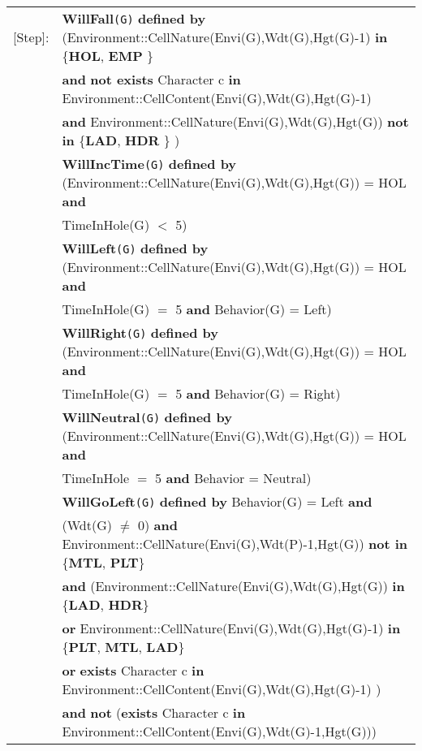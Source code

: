 \documentclass{article}
\begin{document}
\begin{tabular}{rl}
\textrm{[Step]}:
& \textbf{WillFall}\texttt{(G)} \textbf{defined by} (\textrm{Environment::CellNature(Envi(G),Wdt(G),Hgt(G)-1)} \textbf{in} \{\textbf{HOL}, \textbf{EMP} \}  \\
& \quad\quad \textbf{and} \textbf{not exists} \textrm{Character} c \textbf{in} \textrm{Environment::CellContent(Envi(G),Wdt(G),Hgt(G)-1)} \\
& \quad\quad \textbf{and} \textrm{Environment::CellNature(Envi(G),Wdt(G),Hgt(G))} \textbf{not in} \{\textbf{LAD}, \textbf{HDR} \} ) \\

& \textbf{WillIncTime}\texttt{(G)} \textbf{defined by} 
(\textrm{Environment::CellNature(Envi(G),Wdt(G),Hgt(G))} = \textrm{HOL} \textbf{and} \\
& \quad\quad \textrm{TimeInHole(G) $<$ 5)}
\\

& \textbf{WillLeft}\texttt{(G)} \textbf{defined by} 
(\textrm{Environment::CellNature(Envi(G),Wdt(G),Hgt(G))} = \textrm{HOL} \textbf{and} \\
& \quad\quad \textrm{TimeInHole(G)  $=$ 5} \textbf{and} \textrm{Behavior(G) = Left}) \\

& \textbf{WillRight}\texttt{(G)} \textbf{defined by} 
(\textrm{Environment::CellNature(Envi(G),Wdt(G),Hgt(G))} = \textrm{HOL} \textbf{and} \\
& \quad\quad \textrm{TimeInHole(G)  $=$ 5} \textbf{and} \textrm{Behavior(G)  = Right}) \\

& \textbf{WillNeutral}\texttt{(G)} \textbf{defined by} 
(\textrm{Environment::CellNature(Envi(G),Wdt(G),Hgt(G))} = \textrm{HOL} \textbf{and} \\
& \quad\quad \textrm{TimeInHole $=$ 5} \textbf{and} \textrm{Behavior = Neutral}) \\

& \textbf{WillGoLeft}\texttt{(G)} \textbf{defined by}  \textrm{Behavior(G)  = Left} \textbf{and}\\

& \quad (\textrm{Wdt(G)} $\neq$ 0) \textbf{and} \textrm{Environment::CellNature(Envi(G),Wdt(P)-1,Hgt(G))} \textbf{not in} \{\textbf{MTL}, \textbf{PLT}\} \\
& \quad\quad \textbf{and} (\textrm{Environment::CellNature(Envi(G),Wdt(G),Hgt(G))} \textbf{in} \{\textbf{LAD}, \textbf{HDR}\} \\
& \quad\quad\quad\quad \textbf{or} \textrm{Environment::CellNature(Envi(G),Wdt(G),Hgt(G)-1)} \textbf{in} \{\textbf{PLT}, \textbf{MTL}, \textbf{LAD}\} \\
& \quad\quad\quad\quad \textbf{or} \textbf{exists} \textrm{Character} c \textbf{in} \textrm{Environment::CellContent(Envi(G),Wdt(G),Hgt(G)-1)} ) \\
& \quad\quad \textbf{and} \textbf{not} (\textbf{exists} \textrm{Character} c \textbf{in} \textrm{Environment::CellContent(Envi(G),Wdt(G)-1,Hgt(G))}) \\


\end{tabular}
\end{document}
